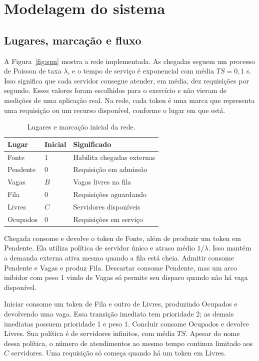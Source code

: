 \documentclass[10pt]{ieeeconf}
\begin{document}
\section{Modelagem do sistema}
\subsection{Lugares, marcação e fluxo}
A Figura~\ref{fig:spn} mostra a rede implementada. As chegadas seguem um processo de Poisson de taxa $\lambda$, e o tempo de serviço é exponencial com média $TS=0{,}1$ s. Isso significa que cada servidor consegue atender, em média, dez requisições por segundo. Esses valores foram escolhidos para o exercício e não vieram de medições de uma aplicação real. Na rede, cada token é uma marca que representa uma requisição ou um recurso disponível, conforme o lugar em que está.

\begin{table}[h]
\centering
\caption{Lugares e marcação inicial da rede.}
\label{tab:lugares}
\begin{tabular}{lll}
\toprule
Lugar & Inicial & Significado\\
\midrule
Fonte & 1 & Habilita chegadas externas\\
Pendente & 0 & Requisição em admissão\\
Vagas & $B$ & Vagas livres na fila\\
Fila & 0 & Requisições aguardando\\
Livres & $C$ & Servidores disponíveis\\
Ocupados & 0 & Requisições em serviço\\
\bottomrule
\end{tabular}
\end{table}

Chegada consome e devolve o token de Fonte, além de produzir um token em Pendente. Ela utiliza política de servidor único e atraso médio $1/\lambda$. Isso mantém a demanda externa ativa mesmo quando a fila está cheia. Admitir consome Pendente e Vagas e produz Fila. Descartar consome Pendente, mas um arco inibidor com peso 1 vindo de Vagas só permite seu disparo quando não há vaga disponível.

Iniciar consome um token de Fila e outro de Livres, produzindo Ocupados e devolvendo uma vaga. Essa transição imediata tem prioridade 2; as demais imediatas possuem prioridade 1 e peso 1. Concluir consome Ocupados e devolve Livres. Sua política é de servidores infinitos, com média $TS$. Apesar do nome dessa política, o número de atendimentos ao mesmo tempo continua limitado aos $C$ servidores. Uma requisição só começa quando há um token em Livres.
\end{document}

